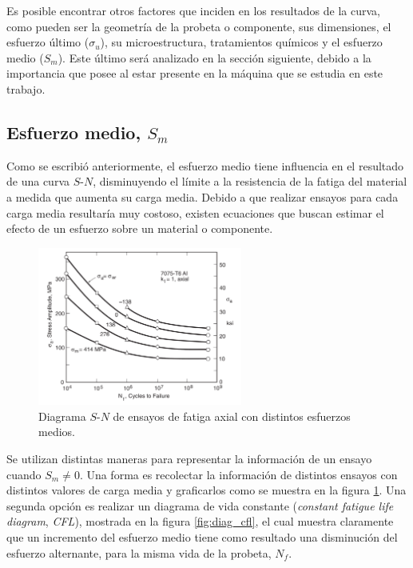 Es posible encontrar otros factores que inciden en los resultados de la curva, como pueden ser la geometría de la probeta o componente, sus dimensiones, el esfuerzo último ($\sigma_{u}$), su microestructura, tratamientos químicos y el esfuerzo medio ($S_m$). Este último será analizado en la sección siguiente, debido a la importancia que posee al estar presente en la máquina que se estudia en este trabajo.

\subsection{Esfuerzo medio, $S_m$}
Como se escribió anteriormente, el esfuerzo medio tiene influencia en el resultado de una curva $S$-$N$, disminuyendo el límite a la resistencia de la fatiga del material a medida que aumenta su carga media. Debido a que realizar ensayos para cada carga media resultaría muy costoso, existen ecuaciones que buscan estimar el efecto de un esfuerzo sobre un material o componente. 

\begin{figure}[h]
\centering
\includegraphics[width=0.6\textwidth]{Imagenes/s_n_mean.pdf}
\caption{Diagrama $S$-$N$ de ensayos de fatiga axial con distintos esfuerzos medios. \cite{dowling2013mechanical}}
\label{fig:s_n_mean}
\end{figure}

Se utilizan distintas maneras para representar la información de un ensayo cuando $S_m \neq 0$. Una forma es recolectar la información de distintos ensayos con distintos valores de carga media y graficarlos como se muestra en la figura \ref{fig:s_n_mean}. Una segunda opción es realizar un diagrama de vida constante (\textit{constant fatigue life diagram}, \textit{CFL}), mostrada en la figura \ref{fig:diag_cfl}, el cual muestra claramente que un incremento del esfuerzo medio tiene como resultado una disminución del esfuerzo alternante, para la misma vida de la probeta, $N_f$.

